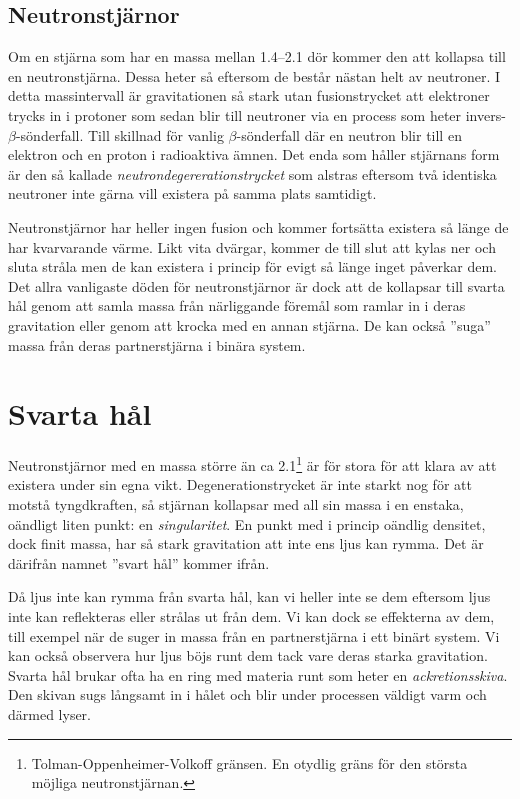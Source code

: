 \subsection{Neutronstjärnor}
Om en stjärna som har en massa mellan \qtyrange{1.4}{2.1}{\Mo} dör kommer den att kollapsa till en neutronstjärna. Dessa heter så eftersom de består nästan helt av neutroner. I detta massintervall är gravitationen så stark utan fusionstrycket att elektroner trycks in i protoner som sedan blir till neutroner via en process som heter invers-$\beta$-sönderfall. Till skillnad för vanlig $\beta$-sönderfall där en neutron blir till en elektron och en proton i radioaktiva ämnen. Det enda som håller stjärnans form är den så kallade \emph{neutrondegererationstrycket} som alstras eftersom två identiska neutroner inte gärna vill existera på samma plats samtidigt.

Neutronstjärnor har heller ingen fusion och kommer fortsätta existera så länge de har kvarvarande värme. Likt vita dvärgar, kommer de till slut att kylas ner och sluta stråla men de kan existera i princip för evigt så länge inget påverkar dem. Det allra vanligaste döden för neutronstjärnor är dock att de kollapsar till svarta hål genom att samla massa från närliggande föremål som ramlar in i deras gravitation eller genom att krocka med en annan stjärna. De kan också ''suga'' massa från deras partnerstjärna i binära system.

\section{Svarta hål}
Neutronstjärnor med en massa större än ca \qty{2.1}{\Mo}\footnote{Tolman-Oppenheimer-Volkoff gränsen. En otydlig gräns för den största möjliga neutronstjärnan.} är för stora för att klara av att existera under sin egna vikt. Degenerationstrycket är inte starkt nog för att motstå tyngdkraften, så stjärnan kollapsar med all sin massa i en enstaka, oändligt liten punkt: en \emph{singularitet}. En punkt med i princip oändlig densitet, dock finit massa, har så stark gravitation att inte ens ljus kan rymma. Det är därifrån namnet ''svart hål'' kommer ifrån.

Då ljus inte kan rymma från svarta hål, kan vi heller inte se dem eftersom ljus inte kan reflekteras eller strålas ut från dem. Vi kan dock se effekterna av dem, till exempel när de suger in massa från en partnerstjärna i ett binärt system. Vi kan också observera hur ljus böjs runt dem tack vare deras starka gravitation. Svarta hål brukar ofta ha en ring med materia runt som heter en \emph{ackretionsskiva}. Den skivan sugs långsamt in i hålet och blir under processen väldigt varm och därmed lyser.

